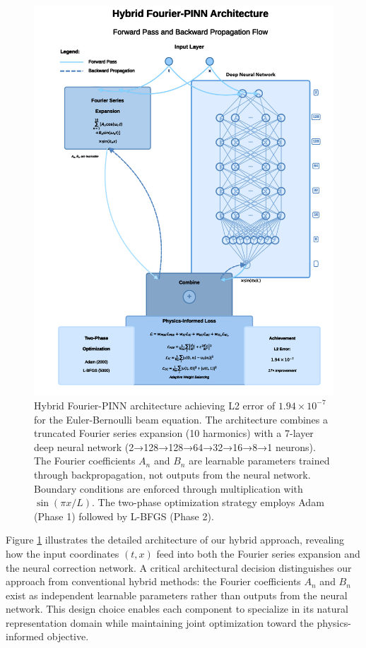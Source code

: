 \begin{figure}[ht]
    \centering
    \includegraphics[width=0.95\linewidth]{figures/pinn_architecture_diagram.png}
    \caption{Hybrid Fourier-PINN architecture achieving L2 error of $1.94 \times 10^{-7}$ for the Euler-Bernoulli beam equation. The architecture combines a truncated Fourier series expansion (10 harmonics) with a 7-layer deep neural network (2→128→128→64→32→16→8→1 neurons). The Fourier coefficients $A_n$ and $B_n$ are learnable parameters trained through backpropagation, not outputs from the neural network. Boundary conditions are enforced through multiplication with $\sin(\pi x/L)$. The two-phase optimization strategy employs Adam (Phase 1) followed by L-BFGS (Phase 2).}
    \label{fig:architecture}
\end{figure}

Figure \ref{fig:architecture} illustrates the detailed architecture of our hybrid approach, revealing how the input coordinates $(t,x)$ feed into both the Fourier series expansion and the neural correction network. A critical architectural decision distinguishes our approach from conventional hybrid methods: the Fourier coefficients $A_n$ and $B_n$ exist as independent learnable parameters rather than outputs from the neural network. This design choice enables each component to specialize in its natural representation domain while maintaining joint optimization toward the physics-informed objective.

